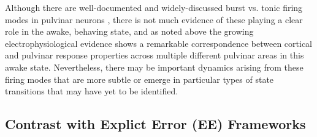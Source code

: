 \documentclass[11pt,twoside]{article}
\newif\myifpdf
\begin{document}
Although there are well-documented and widely-discussed burst vs. tonic firing modes in pulvinar neurons \citep{ShermanGuillery06}, there is not much evidence of these playing a clear role in the awake, behaving state, and as noted above the growing electrophysiological evidence shows a remarkable correspondence between cortical and pulvinar response properties across multiple different pulvinar areas in this awake state.  Nevertheless, there may be important dynamics arising from these firing modes that are more subtle or emerge in particular types of state transitions that may have yet to be identified.

\subsection{Contrast with Explict Error (EE) Frameworks}
\end{document}
